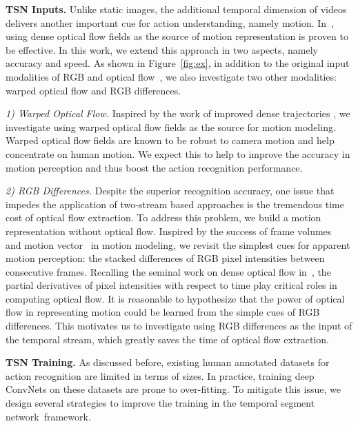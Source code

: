 \documentclass[10pt,journal,compsoc]{IEEEtran}
\newcommand{\SEGNET}{temporal segment network}
\begin{document}
\textbf{TSN Inputs.}
Unlike static images, the additional temporal dimension of videos delivers another important cue for action understanding, namely motion.
In~\cite{SimonyanZ14}, using dense optical flow fields as the source of motion representation is proven to be effective. In this work, we extend this approach in two aspects, namely accuracy and speed. As shown in Figure~\ref{fig:ex}, in addition to the original input modalities of RGB and optical flow~\cite{SimonyanZ14}, we also investigate two other modalities: warped optical flow and RGB differences.

\textit{1) Warped Optical Flow.}
Inspired by the work of improved dense trajectories \cite{WangS13a}, we investigate using warped optical flow fields as the source for motion modeling.
Warped optical flow fields are known to be robust to camera motion and help concentrate on human motion.
We expect this to help to improve the accuracy in motion perception and thus boost the action recognition performance.

\textit{2) RGB Differences.}
Despite the superior recognition accuracy, one issue that impedes the application of two-stream based approaches is the tremendous time cost of optical flow extraction.
To address this problem, we build a motion representation without optical flow.
Inspired by the success of frame volumes~\cite{TranBFTP15} and motion vector~\cite{ZhangWWQW16} in motion modeling, we revisit the simplest cues for apparent motion perception: the stacked differences of RGB pixel intensities between consecutive frames.
Recalling the seminal work on dense optical flow in~\cite{HornB1981}, the partial derivatives of pixel intensities with respect to time play critical roles in computing optical flow.
It is reasonable to hypothesize that the power of optical flow in representing motion could be learned from the simple cues of RGB differences.
This motivates us to investigate using RGB differences as the input of the temporal stream, which greatly saves the time of optical flow extraction.

\textbf{TSN Training.}
As discussed before, existing human annotated datasets for action recognition are limited in terms of sizes.
In practice, training deep ConvNets on these datasets are prone to over-fitting.
To mitigate this issue, we design several strategies to improve the training in the \SEGNET~framework.
\end{document}
